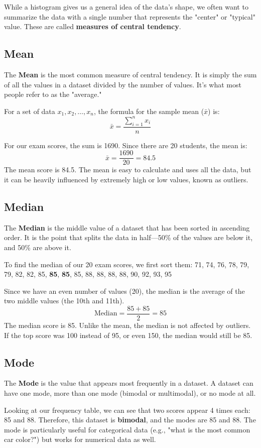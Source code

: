 While a histogram gives us a general idea of the data's shape, we often want to summarize the data with a single number that represents the "center" or "typical" value. These are called \textbf{measures of central tendency}.

\subsection{Mean}
The \textbf{Mean} is the most common measure of central tendency. It is simply the sum of all the values in a dataset divided by the number of values. It's what most people refer to as the "average."

For a set of data $x_1, x_2, \ldots, x_n$, the formula for the sample mean ($\bar{x}$) is:
\[ \bar{x} = \frac{\sum_{i=1}^{n} x_i}{n} \]

For our exam scores, the sum is 1690. Since there are 20 students, the mean is:
\[ \bar{x} = \frac{1690}{20} = 84.5 \]
The mean score is 84.5. The mean is easy to calculate and uses all the data, but it can be heavily influenced by extremely high or low values, known as outliers.

\subsection{Median}
The \textbf{Median} is the middle value of a dataset that has been sorted in ascending order. It is the point that splits the data in half—50\% of the values are below it, and 50\% are above it.

To find the median of our 20 exam scores, we first sort them:
71, 74, 76, 78, 79, 79, 82, 82, 85, \textbf{85}, \textbf{85}, 85, 88, 88, 88, 88, 90, 92, 93, 95

Since we have an even number of values (20), the median is the average of the two middle values (the 10th and 11th).
\[ \text{Median} = \frac{85 + 85}{2} = 85 \]
The median score is 85. Unlike the mean, the median is not affected by outliers. If the top score was 100 instead of 95, or even 150, the median would still be 85.

\subsection{Mode}
The \textbf{Mode} is the value that appears most frequently in a dataset. A dataset can have one mode, more than one mode (bimodal or multimodal), or no mode at all.

Looking at our frequency table, we can see that two scores appear 4 times each: 85 and 88. Therefore, this dataset is \textbf{bimodal}, and the modes are 85 and 88. The mode is particularly useful for categorical data (e.g., "what is the most common car color?") but works for numerical data as well.

